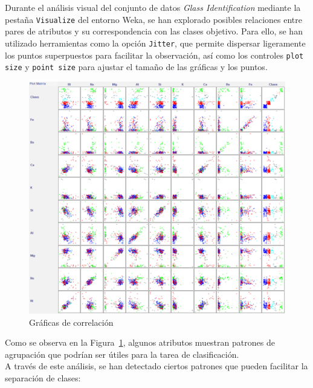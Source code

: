 \documentclass{article}
\begin{document}
Durante el análisis visual del conjunto de datos \textit{Glass Identification} mediante la pestaña \texttt{Visualize} del entorno Weka, se han explorado posibles relaciones entre pares de atributos y su correspondencia con las clases objetivo. Para ello, se han utilizado herramientas como la opción \texttt{Jitter}, que permite dispersar ligeramente los puntos superpuestos para facilitar la observación, así como los controles \texttt{plot size} y \texttt{point size} para ajustar el tamaño de las gráficas y los puntos.\\

\begin{figure}
    \centering
    \includegraphics[width=1\linewidth]{Imágenes/correlation.png}
    \caption{Gráficas de correlación}
    \label{fig:correlation}
\end{figure}

Como se observa en la Figura~\ref{fig:correlation}, algunos atributos muestran patrones de agrupación que podrían ser útiles para la tarea de clasificación.\\

A través de este análisis, se han detectado ciertos patrones que pueden facilitar la separación de clases:
\end{document}
